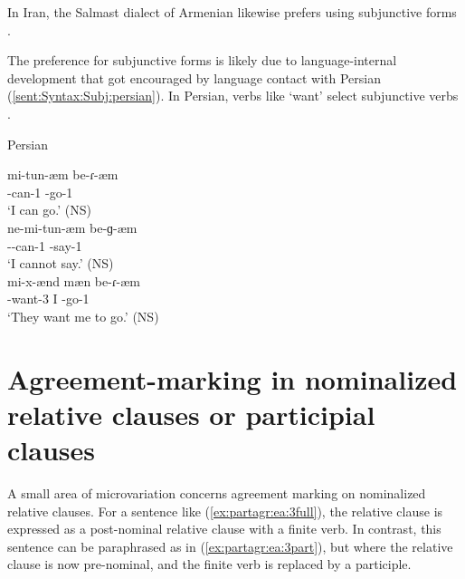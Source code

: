 In Iran, the Salmast dialect of Armenian  likewise prefers using subjunctive forms \citep[\S 4.5]{Vaux-Salmast}.  

The preference for subjunctive forms is likely due to language-internal development that got encouraged by language contact with Persian (\ref{sent:Syntax:Subj:persian}). In Persian, verbs like `want' select subjunctive verbs    \citep[29]{Mahootian-2002-PersianGrammar}.\pagebreak

\begin{exe}
	\ex Persian\label{sent:Syntax:Subj:persian}
	\begin{xlist}
		\ex \gll mi-tun-æm be-ɾ-æm  \\
		{\prog}-can-1{\sg}  {\subj}-go-1{\sg} \\ 
		\trans `I can go.' \hfill (NS) \\
		\ex \gll ne-mi-tun-æm be-ɡ-æm \\
		{\neggloss}-{\prog}-can-1{\sg}  {\subj}-say-1{\sg} \\ 
		\trans `I cannot say.' \hfill (NS) \\
		\ex \gll mi-x-ænd mæn be-ɾ-æm\\
		{\prog}-want-3{\pl}  I {\subj}-go-1{\sg} \\ 
		\trans `They want me to go.' \hfill (NS) \\
		
	\end{xlist}
\end{exe}





\section{Agreement-marking in nominalized relative clauses or participial clauses}\label{section:syntax:participleClause}

A small area of microvariation concerns agreement marking on nominalized relative clauses. For a sentence like (\ref{ex:partagr:ea:3full}), the relative clause is   expressed   as a post-nominal relative  clause with a finite verb. In contrast, this sentence can be paraphrased as in (\ref{ex:partagr:ea:3part}), but where the relative clause is now pre-nominal, and the finite verb is replaced by a participle. 


